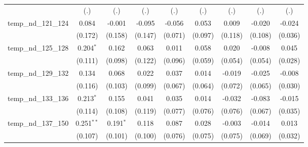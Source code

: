 \documentclass[12pt]{article}
\newcommand{\sym}[1]{\ensuremath{^{#1}}}
\begin{document}
\begin{appendices}
\begin{table}[h!]
\begin{tabular}{l*{8}{c}}
                    &         (.)         &         (.)         &         (.)         &         (.)         &         (.)         &         (.)         &         (.)         &         (.)         \\
temp\_nd\_121\_124     &       0.084         &      -0.001         &      -0.095         &      -0.056         &       0.053         &       0.009         &      -0.020         &      -0.024         \\
                    &     (0.172)         &     (0.158)         &     (0.147)         &     (0.071)         &     (0.097)         &     (0.118)         &     (0.108)         &     (0.036)         \\
temp\_nd\_125\_128     &       0.204\sym{*}  &       0.162         &       0.063         &       0.011         &       0.058         &       0.020         &      -0.008         &       0.045         \\
                    &     (0.111)         &     (0.098)         &     (0.122)         &     (0.096)         &     (0.059)         &     (0.054)         &     (0.054)         &     (0.028)         \\
temp\_nd\_129\_132     &       0.134         &       0.068         &       0.022         &       0.037         &       0.014         &      -0.019         &      -0.025         &      -0.008         \\
                    &     (0.116)         &     (0.103)         &     (0.099)         &     (0.067)         &     (0.064)         &     (0.072)         &     (0.065)         &     (0.030)         \\
temp\_nd\_133\_136     &       0.213\sym{*}  &       0.155         &       0.041         &       0.035         &       0.014         &      -0.032         &      -0.083         &      -0.015         \\
                    &     (0.114)         &     (0.108)         &     (0.119)         &     (0.077)         &     (0.076)         &     (0.076)         &     (0.067)         &     (0.035)         \\
temp\_nd\_137\_150     &       0.251\sym{**} &       0.191\sym{*}  &       0.118         &       0.087         &       0.028         &      -0.003         &      -0.014         &       0.013         \\
                    &     (0.107)         &     (0.101)         &     (0.100)         &     (0.076)         &     (0.075)         &     (0.075)         &     (0.069)         &     (0.032)         \\

\end{tabular}
\end{table}
\end{appendices}
\end{document}
